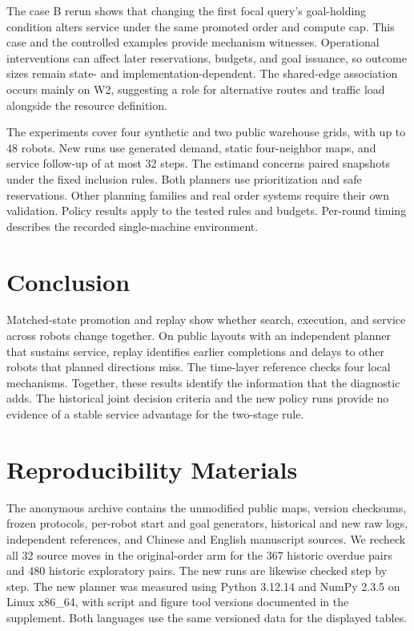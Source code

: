 \documentclass{article}
\begin{document}
The case B rerun shows that changing the first focal query's goal-holding condition alters service under the same promoted order and compute cap. This case and the controlled examples provide mechanism witnesses. Operational interventions can affect later reservations, budgets, and goal issuance, so outcome sizes remain state- and implementation-dependent. The shared-edge association occurs mainly on W2, suggesting a role for alternative routes and traffic load alongside the resource definition.

The experiments cover four synthetic and two public warehouse grids, with up to 48 robots. New runs use generated demand, static four-neighbor maps, and service follow-up of at most 32 steps. The estimand concerns paired snapshots under the fixed inclusion rules. Both planners use prioritization and safe reservations. Other planning families and real order systems require their own validation. Policy results apply to the tested rules and budgets. Per-round timing describes the recorded single-machine environment.

\section{Conclusion}
Matched-state promotion and replay show whether search, execution, and service across robots change together. On public layouts with an independent planner that sustains service, replay identifies earlier completions and delays to other robots that planned directions miss. The time-layer reference checks four local mechanisms. Together, these results identify the information that the diagnostic adds. The historical joint decision criteria and the new policy runs provide no evidence of a stable service advantage for the two-stage rule.

\label{end:main}
\section*{Reproducibility Materials}
The anonymous archive contains the unmodified public maps, version checksums, frozen protocols, per-robot start and goal generators, historical and new raw logs, independent references, and Chinese and English manuscript sources. We recheck all 32 source moves in the original-order arm for the 367 historic overdue pairs and 480 historic exploratory pairs. The new runs are likewise checked step by step. The new planner was measured using Python 3.12.14 and NumPy 2.3.5 on Linux x86\_64, with script and figure tool versions documented in the supplement. Both languages use the same versioned data for the displayed tables.
\end{document}
